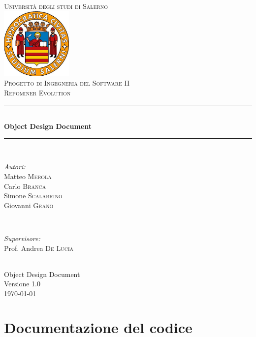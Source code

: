 \documentclass[a4paper, 12pt, italian]{report}
\begin{document}
\begin{titlepage}
\newcommand{\HRule}{\rule{\linewidth}{0.5mm}} 
\center 
\textsc{\LARGE Università degli studi di Salerno}\\[1cm] 
\includegraphics[width=3.5cm]{img/logo.jpg} \\[1cm]
\textsc{\large Progetto di Ingegneria del Software II}\\[0.5cm]
\textsc{\Large Repominer Evolution}\\[0.5cm] 
 \HRule \\[0.4cm]
{ \large \bfseries Object Design Document}\\[0.4cm] 
\HRule \\[1.5cm]

\begin{minipage}{0.4\textwidth}
\begin{flushleft} \large
\emph{Autori:}\\
Matteo \textsc{Merola}\\
Carlo \textsc{Branca}\\
Simone \textsc{Scalabrino}\\
Giovanni \textsc{Grano}\\
\end{flushleft}
\end{minipage}
~
\begin{minipage}{0.4\textwidth}
\begin{flushright} \large
\emph{Supervisore:} \\
Prof. Andrea \textsc{De Lucia}
\end{flushright}
\end{minipage}\\[2.5cm]

{\Large Object Design Document}\\
Versione 1.0\\[1cm]

{\large \today} %

\vfill

\end{titlepage}	
       
	\setcounter{tocdepth}{1}	
	\tableofcontents
	
	
	
\chapter{Documentazione del codice} {

}
	
\end{document}
